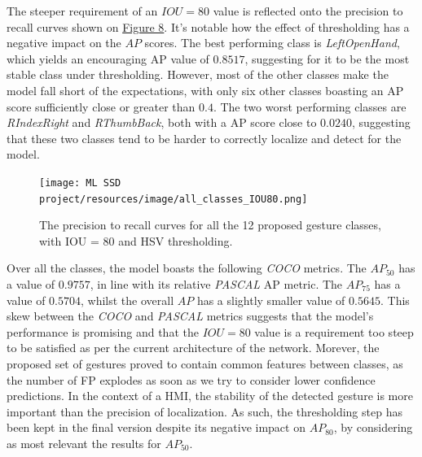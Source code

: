 \documentclass[10pt,twocolumn,letterpaper]{article}
\begin{document}
\begin{flushleft}
The steeper requirement of an $IOU=80$ value is reflected onto the precision to recall curves shown on \hyperref[figure8]{Figure 8}. It's notable how the effect of thresholding has a negative impact on the $AP$ scores.
The best performing class is \textit{LeftOpenHand}, which yields an encouraging AP value of $0.8517$, suggesting for it to be the most stable class under thresholding. However, most of the other classes make the model fall short of the expectations, with only six other classes boasting an AP score sufficiently close or greater than $0.4$. The two worst performing classes are \textit{RIndexRight} and \textit{RThumbBack}, both with a AP score close to $0.0240$, suggesting that these two classes tend to be harder to correctly localize and detect for the model.

\begin{figure}[!h]
    \centering
    \texttt{[image: ML SSD project/resources/image/all\_classes\_IOU80.png]}
    \caption{The precision to recall curves for all the 12 proposed gesture classes, with IOU = 80 and HSV thresholding.}
\end{figure}
\label{figure8}

Over all the classes, the model boasts the following \textit{COCO} metrics. The $AP_{50}$ has a value of $0.9757$, in line with its relative \textit{PASCAL} AP metric. The $AP_{75}$ has a value of $0.5704$, whilst the overall $AP$ has a slightly smaller value of $0.5645$. This skew between the \textit{COCO} and \textit{PASCAL} metrics suggests that the model's performance is promising and that the $IOU=80$ value is a requirement too steep to be satisfied as per the current architecture of the network. Morever, the proposed set of gestures proved to contain common features between classes, as the number of FP explodes as soon as we try to consider lower confidence predictions.
In the context of a HMI, the stability of the detected gesture is more important than the precision of localization. As such, the thresholding step has been kept in the final version despite its negative impact on $AP_{80}$, by considering as most relevant the results for $AP_{50}$.

\end{flushleft}
\end{document}
